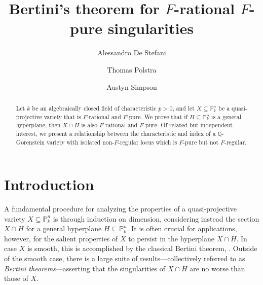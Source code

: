\documentclass[reqno,11pt]{amsart}
\numberwithin{equation}{section}
\theoremstyle{definition}
\theoremstyle{definition}
\theoremstyle{definition}
\theoremstyle{remark}
\newcommand{\Q}{\mathbb{Q}}
\newcommand{\PP}{\mathbb{P}}
\begin{document}
\title{Bertini's theorem for \texorpdfstring{$F$}{F}-rational \texorpdfstring{$F$}{F}-pure singularities}


\author[De Stefani]{Alessandro De Stefani}
\address{Dipartimento di Matematica, Universit\`{a} di Genova, Via Dodecaneso 35, 16146 Genova,
Italy}


\author[Polstra]{Thomas Polstra}
\address{Department of Mathematics, University of Alabama, Tuscaloosa, AL 35487 USA}

\author[Simpson]{Austyn Simpson}
\address{Department of Mathematics, Bates College, 3 Andrews Rd, Lewiston, ME 04240 USA}

\begin{abstract}
Let $k$ be an algebraically closed field of characteristic $p>0$, and let $X\subseteq\PP^n_k$ be a quasi-projective variety that is $F$-rational and $F$-pure. We prove that if $H \subseteq \PP^n_k$ is a general hyperplane, then $X \cap H$ is also $F$-rational and $F$-pure. Of related but independent interest, we present a relationship between the characteristic and index of a $\Q$-Gorenstein variety with isolated non-$F$-regular locus which is $F$-pure but not $F$-regular.
\end{abstract}

\maketitle

\section{Introduction}

A fundamental procedure for analyzing the properties of a quasi-projective variety $X\subseteq \PP^n_k$ is through induction on dimension, considering instead the section $X\cap H$ for a general hyperplane $H\subseteq \PP^n_k$. It is often crucial for applications, however, for the salient properties of $X$ to persist in the hyperplane $X\cap H$. In case $X$ is smooth, this is accomplished by the classical Bertini theorem, \cite[II, Theorem 8.18]{Har77}. Outside of the smooth case, there is a large suite of results---collectively referred to as \emph{Bertini theorems}---asserting that the singularities of $X\cap H$ are no worse than those of $X$.
\end{document}
